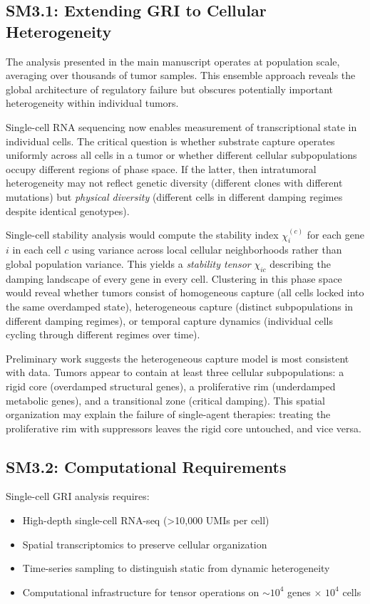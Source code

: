 \documentclass[11pt,letterpaper]{article}
\begin{document}
\subsection{SM3.1: Extending GRI to Cellular Heterogeneity}

The analysis presented in the main manuscript operates at population scale, averaging over thousands of tumor samples. This ensemble approach reveals the global architecture of regulatory failure but obscures potentially important heterogeneity within individual tumors.

Single-cell RNA sequencing now enables measurement of transcriptional state in individual cells. The critical question is whether substrate capture operates uniformly across all cells in a tumor or whether different cellular subpopulations occupy different regions of phase space. If the latter, then intratumoral heterogeneity may not reflect genetic diversity (different clones with different mutations) but \textit{physical diversity} (different cells in different damping regimes despite identical genotypes).

Single-cell stability analysis would compute the stability index $\chi_i^{(c)}$ for each gene $i$ in each cell $c$ using variance across local cellular neighborhoods rather than global population variance. This yields a \textit{stability tensor} $\chi_{ic}$ describing the damping landscape of every gene in every cell. Clustering in this phase space would reveal whether tumors consist of homogeneous capture (all cells locked into the same overdamped state), heterogeneous capture (distinct subpopulations in different damping regimes), or temporal capture dynamics (individual cells cycling through different regimes over time).

Preliminary work suggests the heterogeneous capture model is most consistent with data. Tumors appear to contain at least three cellular subpopulations: a rigid core (overdamped structural genes), a proliferative rim (underdamped metabolic genes), and a transitional zone (critical damping). This spatial organization may explain the failure of single-agent therapies: treating the proliferative rim with suppressors leaves the rigid core untouched, and vice versa.

\subsection{SM3.2: Computational Requirements}

Single-cell GRI analysis requires:
\begin{itemize}
\item High-depth single-cell RNA-seq (>10,000 UMIs per cell)
\item Spatial transcriptomics to preserve cellular organization
\item Time-series sampling to distinguish static from dynamic heterogeneity
\item Computational infrastructure for tensor operations on $\sim 10^4$ genes $\times$ $10^4$ cells
\end{itemize}
\end{document}
